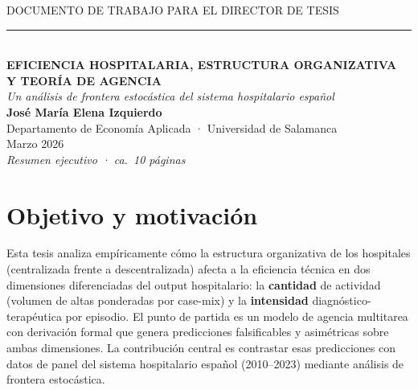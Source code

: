 \documentclass[12pt, a4paper]{article}
\begin{document}

\thispagestyle{empty}
\vspace*{3cm}

\begin{center}
  {\small\color{gristexto}\MakeUppercase{Documento de trabajo para el director de tesis}}\\[6pt]
  \rule{\linewidth}{1.5pt}\\[18pt]

  {\LARGE\bfseries\color{azultesis}
    EFICIENCIA HOSPITALARIA, ESTRUCTURA ORGANIZATIVA\\[4pt]
    Y TEORÍA DE AGENCIA}\\[10pt]

  {\large\itshape\color{gristexto}
    Un análisis de frontera estocástica del sistema hospitalario español}\\[30pt]

  {\large\bfseries José María Elena Izquierdo}\\[6pt]
  {\normalsize\color{gristexto}
    Departamento de Economía Aplicada · Universidad de Salamanca}\\[6pt]
  {\normalsize\color{gristexto} Marzo 2026}\\[40pt]

  {\small\itshape\color{gristexto} Resumen ejecutivo · ca.\ 10 páginas}
\end{center}

\newpage
\setcounter{page}{1}

\section{Objetivo y motivación}

Esta tesis analiza empíricamente cómo la estructura organizativa de los
hospitales (centralizada frente a descentralizada) afecta a la eficiencia
técnica en dos dimensiones diferenciadas del output hospitalario: la
\textbf{cantidad} de actividad (volumen de altas ponderadas por case-mix) y la
\textbf{intensidad} diagnóstico-terapéutica por episodio. El punto de partida
es un modelo de agencia multitarea con derivación formal  que
genera predicciones falsificables y asimétricas sobre ambas dimensiones. La
contribución central es contrastar esas predicciones con datos de panel del
sistema hospitalario español (2010--2023) mediante análisis de frontera
estocástica.
\end{document}
